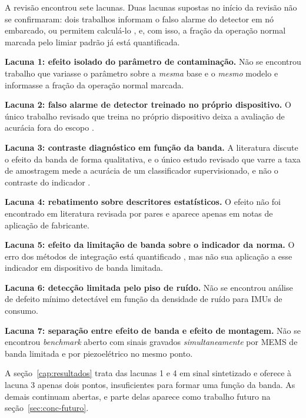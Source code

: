 A revisão encontrou sete lacunas. Duas lacunas supostas no início da revisão não se confirmaram: dois trabalhos informam o falso alarme do
detector em nó embarcado, ou permitem calculá-lo \cite{chevtchenko2023,kolok2025}, e, com isso, a fração da operação normal marcada pelo limiar padrão já está quantificada.

\textbf{Lacuna 1: efeito isolado do parâmetro de contaminação.} Não se encontrou trabalho que variasse o parâmetro sobre a \emph{mesma} base e o \emph{mesmo} modelo e informasse a fração da operação normal
        marcada.

\textbf{Lacuna 2: falso alarme de detector treinado no próprio dispositivo.} O único trabalho revisado que treina no próprio dispositivo deixa a avaliação de acurácia fora do escopo \cite{antonini2023}.

\textbf{Lacuna 3: contraste diagnóstico em função da banda.} A literatura discute o efeito da banda de forma qualitativa, e o único estudo revisado que varre a taxa de amostragem mede a acurácia de um
        classificador supervisionado, e não o contraste do indicador \cite{elbouharrouti2024}.

\textbf{Lacuna 4: rebatimento sobre descritores estatísticos.} O efeito não foi encontrado em literatura revisada por pares e aparece apenas em notas de aplicação de fabricante.

\textbf{Lacuna 5: efeito da limitação de banda sobre o indicador da norma.} O erro dos métodos de integração está quantificado \cite{brandt2014}, mas não sua aplicação a esse indicador em dispositivo de banda
        limitada.

\textbf{Lacuna 6: detecção limitada pelo piso de ruído.} Não se encontrou análise de defeito mínimo detectável em função da densidade de ruído para IMUs de consumo.

\textbf{Lacuna 7: separação entre efeito de banda e efeito de montagem.} Não se encontrou \emph{benchmark} aberto com sinais gravados \emph{simultaneamente} por MEMS de banda limitada e por piezoelétrico no
        mesmo ponto.

A seção~\ref{cap:resultados} trata das lacunas 1 e 4 em sinal sintetizado e oferece à lacuna 3 apenas dois pontos, insuficientes para formar uma função da banda. As demais continuam abertas, e parte delas
aparece como trabalho futuro na seção~\ref{sec:conc-futuro}.
